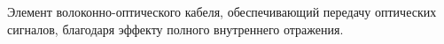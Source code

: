 Элемент волоконно-оптического кабеля, обеспечивающий передачу 
оптических сигналов, благодаря эффекту полного внутреннего
отражения.